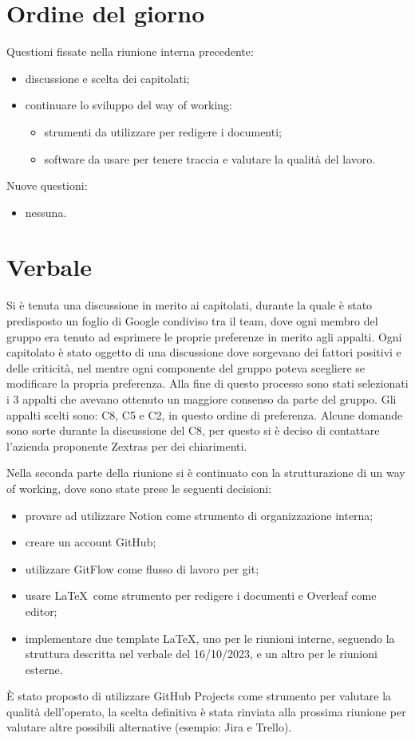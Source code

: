 \documentclass[12pt]{article}
\begin{document}
    \section{Ordine del giorno}
	    Questioni fissate nella riunione interna precedente:
	    \begin{itemize}
	    	\item discussione e scelta dei capitolati;
	    	\item continuare lo sviluppo del way of working:
	    	\begin{itemize}
	    		\item strumenti da utilizzare per redigere i documenti;
	    		\item software da usare per tenere traccia e valutare la qualità del lavoro.
	    	\end{itemize}
	    \end{itemize}
	    Nuove questioni:
	    \begin{itemize}
	    	\item nessuna.
	    \end{itemize}
    
    \section{Verbale}
	    Si è tenuta una discussione in merito ai capitolati, durante la quale è stato
	    predisposto un foglio di Google condiviso tra il team, dove ogni membro del gruppo era tenuto ad esprimere le proprie preferenze in merito agli appalti. Ogni capitolato è stato oggetto di una discussione dove sorgevano dei fattori positivi e delle criticità, nel mentre ogni componente del gruppo poteva scegliere se modificare la propria preferenza. Alla fine di questo processo sono stati selezionati i 3 appalti che avevano ottenuto un maggiore consenso da parte del gruppo.
	    Gli appalti scelti sono: C8, C5 e C2, in questo ordine di preferenza. Alcune
	    domande sono sorte durante la discussione del C8, per questo si è deciso di
	    contattare l'azienda proponente Zextras per dei chiarimenti.
	    
	    Nella seconda parte della riunione si è continuato con la strutturazione di
	    un way of working, dove sono state prese le seguenti decisioni:
	    \begin{itemize}
	    	\item provare ad utilizzare Notion come strumento di organizzazione interna;
	    	\item creare un account GitHub;
	    	\item utilizzare GitFlow come flusso di lavoro per git;
	    	\item usare \LaTeX\ come strumento per redigere i documenti e Overleaf come editor;
	    	\item implementare due template \LaTeX, uno per le riunioni interne, seguendo la struttura descritta nel verbale del 16/10/2023, e un altro per le riunioni esterne.
	    \end{itemize}
	    È stato proposto di utilizzare GitHub Projects come strumento per valutare la qualità
	    dell'operato, la scelta definitiva è stata rinviata alla prossima riunione per valutare
	    altre possibili alternative (esempio: Jira e Trello).
	    
\end{document}
